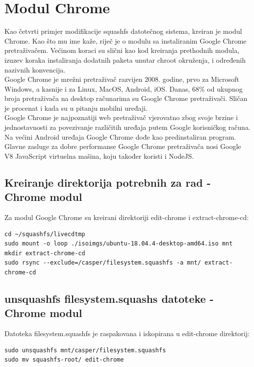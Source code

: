 \documentclass[12pt,vi]{mitthesis}
\begin{document}
\section*{Modul Chrome}
\indent
Kao četvrti primjer modifikacije squashfs datotečnog sistema, kreiran je modul Chrome. Kao što mu ime kaže, riječ je o modulu sa instaliranim Google Chrome pretraživačem. Većinom koraci su slični kao kod kreiranja prethodnih modula, izuzev koraka instaliranja dodatnih paketa unutar chroot okruženja, i određenih nazivnih konvencija.\\
\indent
Google Chrome je mrežni pretraživač razvijen 2008. godine, prvo za Microsoft Windows, a kasnije i za Linux, MacOS, Android, iOS. Danas, 68\% od ukupnog broja pretraživača na desktop računarima su Google Chrome pretraživači. Sličan je procenat i kada su u pitanju mobilni uređaji.\\
\indent
Google Chrome je najpoznatiji web pretraživač vjerovatno zbog svoje brzine i jednostavnosti za povezivanje različitih uređaja putem Google korisničkog računa. Na većini Android uređaja Google Chrome dođe kao predinstaliran program. Glavne zasluge za dobre performanse Google Chrome pretraživača nosi Google V8 JavaScript virtuelna mašina, koju također koristi i NodeJS.
\subsection*{Kreiranje direktorija potrebnih za rad - Chrome modul}
\indent
Za modul Google Chrome su kreirani direktoriji edit-chrome i extract-chrome-cd:
\begin{lstlisting}[style=BashInputStyle]
cd ~/squashfs/livecdtmp
sudo mount -o loop ./isoimgs/ubuntu-18.04.4-desktop-amd64.iso mnt
mkdir extract-chrome-cd
sudo rsync --exclude=/casper/filesystem.squashfs -a mnt/ extract-chrome-cd
\end{lstlisting}

\subsection*{unsquashfs filesystem.squashs datoteke - Chrome modul}
\indent
Datoteka filesystem.squashfs je raspakovana i iskopirana u edit-chrome direktorij:\\
\begin{lstlisting}[style=BashInputStyle]
sudo unsquashfs mnt/casper/filesystem.squashfs
sudo mv squashfs-root/ edit-chrome
\end{lstlisting}
\end{document}
